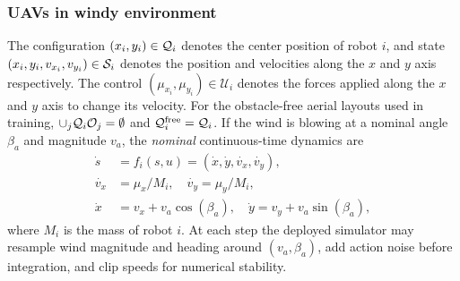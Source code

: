 \documentclass{article}
\begin{document}
\subsubsection{UAVs in windy environment} The configuration $(x_i, y_i) \in \mathcal{Q}_i$ denotes the center position of robot $i$, and state $(x_i, y_i, v_{x_i}, v_{y_i}) \in \mathcal{S}_i$ denotes the position and velocities along the $x$ and $y$ axis respectively. The control $(\mu_{x_i}, \mu_{y_i}) \in \mathcal{U}_i$ denotes the forces applied along the $x$ and $y$ axis to change its velocity. For the obstacle-free aerial layouts used in training, $\cup_j \mathcal{Q}_i \mathcal{O}_j = \emptyset$ and $\mathcal{Q}_i^{\mathrm{free}} = \mathcal{Q}_i$. If the wind is blowing at a nominal angle $\beta_a$ and magnitude $v_a$, the \emph{nominal} continuous-time dynamics are
\begin{align}
\dot{s} &= f_i(s,u) = (\dot{x}, \dot{y}, \dot{v_{x}}, \dot{v_{y}}),\\
\dot{v_x} &= \mu_x / M_i , \quad \dot{v_y} = \mu_y / M_i,  \\
\dot{x} &= v_x + v_a \cos(\beta_a), \quad  \dot{y} = v_y + v_a \sin(\beta_a),
\end{align}
where $M_i$ is the mass of robot $i$. At each step the deployed simulator may resample wind magnitude and heading around $(v_a,\beta_a)$, add action noise before integration, and clip speeds for numerical stability.
\end{document}
